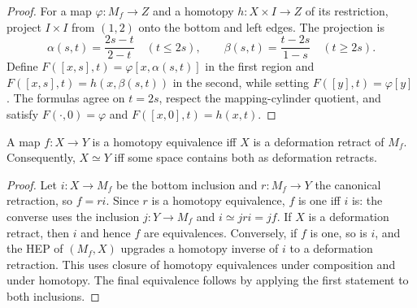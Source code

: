 \begin{proof}
\leanok
\sketch For a map $\varphi:M_f\to Z$ and a homotopy $h:X\times I\to Z$ of its
restriction, project $I\times I$ from $(1,2)$ onto the bottom and left edges. The
projection is
\[
\alpha(s,t)=\frac{2s-t}{2-t}\quad(t\le2s),\qquad
\beta(s,t)=\frac{t-2s}{1-s}\quad(t\ge2s).
\]
Define $F([x,s],t)=\varphi[x,\alpha(s,t)]$ in the first region and
$F([x,s],t)=h(x,\beta(s,t))$ in the second, while setting $F([y],t)=\varphi[y]$.
The formulas agree on $t=2s$, respect the mapping-cylinder quotient, and satisfy
$F(\cdot,0)=\varphi$ and $F([x,0],t)=h(x,t)$.
\end{proof}

\begin{corollary}
\label{cor:homotopy-equivalence-iff-deformation-retract-mapping-cylinder}
\leanok
{}
A map $f:X\to Y$ is a homotopy equivalence iff $X$ is a deformation retract of
$M_f$. Consequently, $X\simeq Y$ iff some space contains both as deformation retracts.
\end{corollary}

\begin{proof}
\leanok
\sketch Let $i:X\to M_f$ be the bottom inclusion and $r:M_f\to Y$ the canonical
retraction, so $f=ri$. Since $r$ is a homotopy equivalence, $f$ is one iff $i$ is:
the converse uses the inclusion $j:Y\to M_f$ and $i\simeq jri=jf$. If $X$ is a
deformation retract, then $i$ and hence $f$ are equivalences. Conversely, if $f$ is
one, so is $i$, and the HEP of $(M_f,X)$ upgrades a homotopy inverse of $i$ to a
deformation retraction. This uses closure of homotopy equivalences under composition
and under homotopy. The final equivalence follows by applying the first statement to
both inclusions.
\end{proof}
